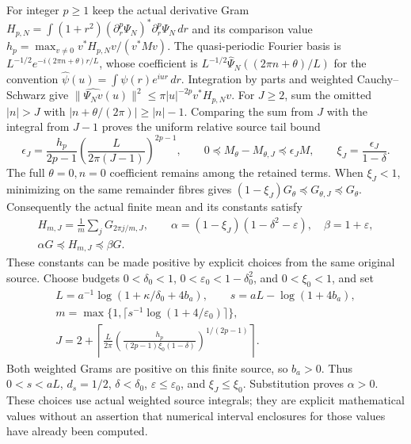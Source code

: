 For integer $p\ge1$ keep the actual derivative Gram
$H_{p,N}=\int(1+r^2)(\partial_r^p\Psi_N)^*
\partial_r^p\Psi_N\,dr$ and its comparison value
$h_p=\max_{v\ne0}v^*H_{p,N}v/(v^*Mv)$.
The quasi-periodic Fourier basis is
$L^{-1/2}e^{-i(2\pi n+\theta)r/L}$, whose coefficient is
$L^{-1/2}\widehat\Psi_N((2\pi n+\theta)/L)$ for the convention
$\widehat\psi(u)=\int\psi(r)e^{iur}\,dr$.
Integration by parts and weighted Cauchy--Schwarz give
$\|\widehat{\Psi_Nv}(u)\|^2\le\pi|u|^{-2p}v^*H_{p,N}v$.
For $J\ge2$, sum the omitted $|n|>J$ with
$|n+\theta/(2\pi)|\ge|n|-1$. Comparing the sum from $J$ with the
integral from $J-1$ proves the uniform relative source tail bound
\[
 \epsilon_J=\frac{h_p}{2p-1}
       \left(\frac{L}{2\pi(J-1)}\right)^{2p-1},\qquad
 0\preceq M_\theta-M_{\theta,J}\preceq\epsilon_J M,
 \qquad \xi_J=\frac{\epsilon_J}{1-\delta}.
 \tag{HG18}
\]
The full $\theta=0,n=0$ coefficient remains among the retained terms.
When $\xi_J<1$, minimizing on the same remainder fibres gives
$(1-\xi_J)G_\theta\preceq G_{\theta,J}\preceq G_\theta$.
Consequently the actual finite mean and its constants satisfy
\[
\begin{gathered}
 H_{m,J}=\frac1m\sum_jG_{2\pi j/m,J},\qquad
 \alpha=(1-\xi_J)(1-\delta^2-\varepsilon),\quad
 \beta=1+\varepsilon,\\
 \alpha G\preceq H_{m,J}\preceq\beta G .
\end{gathered}\tag{HG19}
\]
These constants can be made positive by explicit choices from the
same original source. Choose budgets $0<\delta_0<1$,
$0<\varepsilon_0<1-\delta_0^2$, and $0<\xi_0<1$, and set
\[
\begin{gathered}
 L=a^{-1}\log(1+\kappa/\delta_0+4b_a),\qquad
 s=aL-\log(1+4b_a),\\
 m=\max\{1,\lceil s^{-1}\log(1+4/\varepsilon_0)\rceil\},\\
 J=2+\left\lceil\frac{L}{2\pi}
 \left(\frac{h_p}{(2p-1)\xi_0(1-\delta)}
 \right)^{1/(2p-1)}\right\rceil .
\end{gathered}\tag{HG20}
\]
Both weighted Grams are positive on this finite source, so $b_a>0$.
Thus $0<s<aL$, $d_s=1/2$, $\delta<\delta_0$,
$\varepsilon\le\varepsilon_0$, and $\xi_J\le\xi_0$.
Substitution proves $\alpha>0$. These choices use actual weighted
source integrals; they are explicit mathematical values without an
assertion that numerical interval enclosures for those values have
already been computed.

